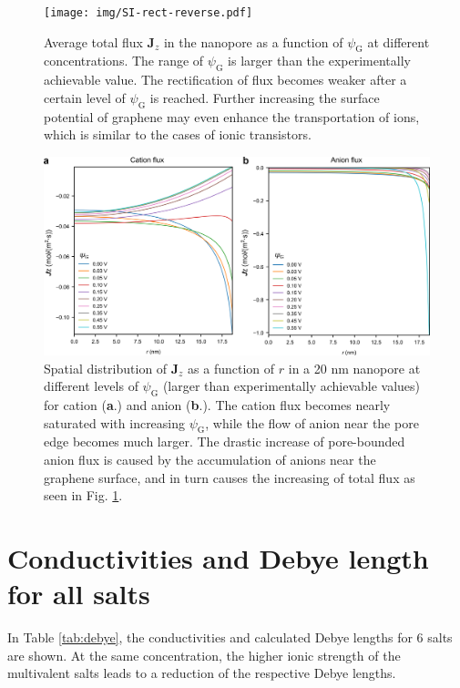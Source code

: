\documentclass[manuscript=suppinfo,email=true, hyperref=true, keywords=false]{achemso}
\newcommand{\Fig}{Fig.}
\begin{document}
\begin{figure}[htbp]
  \centering
  \texttt{[image: img/SI-rect-reverse.pdf]}
  \caption{Average total flux $\boldsymbol{J}_{z}$ in the nanopore as
    a function of $\psi_{\mathrm{G}}$ at different concentrations. The
    range of $\psi_{\mathrm{G}}$ is larger than the experimentally
    achievable value. The rectification of flux becomes weaker after a
    certain level of $\psi_{\mathrm{G}}$ is reached. Further
    increasing the surface potential of graphene may even enhance the
    transportation of ions, which is similar to the cases of ionic
    transistors.}
  \label{fig:reverse}
\end{figure}


\begin{figure}[htbp]
  \centering
  \includegraphics[width=0.8\linewidth]{img/SI-flux-larger.png}
  \caption{Spatial distribution of $\boldsymbol{J}_{z}$ as a function
    of $r$ in a 20 nm nanopore at different levels of
    $\psi_{\mathrm{G}}$ (larger than experimentally achievable values)
    for cation (\textbf{a}.) and anion (\textbf{b}.). The cation flux
    becomes nearly saturated with increasing $\psi_{\mathrm{G}}$,
    while the flow of anion near the pore edge becomes much
    larger. The drastic increase of pore-bounded anion flux is caused
    by the accumulation of anions near the graphene surface, and in
    turn causes the increasing of total flux as seen in \Fig
    \ref{fig:reverse}.}
  \label{fig:large-V}
\end{figure}
\clearpage{}

\section{Conductivities and Debye length for all salts}
\label{sec:salts}
In Table \ref{tab:debye}, the conductivities and calculated Debye
lengths for 6 salts are shown. At the same concentration, the higher
ionic strength of the multivalent salts leads to a reduction of the
respective Debye lengths.
\end{document}
